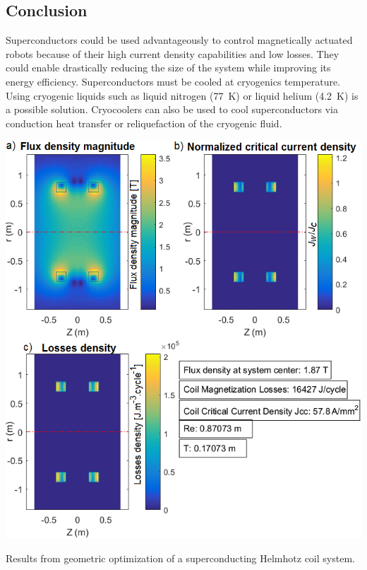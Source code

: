 \documentclass{ws-jmrr}
\begin{document}
\begin{multicols}{2}
\section{Conclusion}
Superconductors could be used advantageously to control magnetically actuated robots because of their high current density capabilities and low losses.
 They could enable drastically reducing the size of the system while improving its energy efficiency. Superconductors must be cooled at cryogenics temperature. Using cryogenic liquids such as liquid nitrogen (77~K) or liquid helium (4.2~K) is a possible solution. 
 Cryocoolers can also be used to cool superconductors via conduction heat transfer or reliquefaction of the cryogenic fluid.\par 
\begin{figurehere}
	\begin{center}
	\includegraphics[width=\linewidth]{SimResults.png}
	\label{Results}
	\vspace{-0.5cm}
	\caption{Results from geometric optimization of a superconducting Helmhotz coil system.}
	\end{center}
\end{figurehere}
\vspace{-0.5cm}



\end{multicols}
\end{document}
